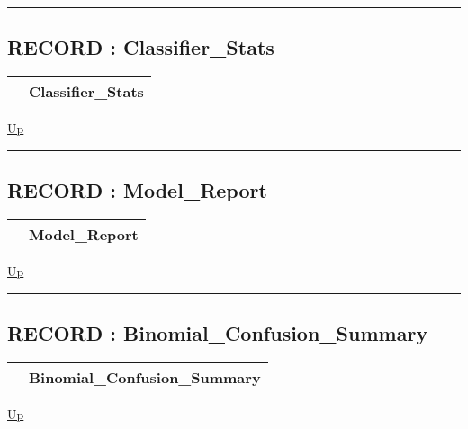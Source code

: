 \rule{\textwidth}{0.4pt}
\subsection*{RECORD : Classifier\_Stats}
\hypertarget{ecldoc:logisticregression.types.classifier_stats}{}

{\renewcommand{\arraystretch}{1.5}
\begin{tabularx}{\textwidth}{|>{\raggedright\arraybackslash}l|X|}
\hline
\hspace{0pt} & Classifier\_Stats \\
\hline
\end{tabularx}
}

\hyperlink{ecldoc:LogisticRegression.Types}{Up}

\par


\rule{\textwidth}{0.4pt}
\subsection*{RECORD : Model\_Report}
\hypertarget{ecldoc:logisticregression.types.model_report}{}

{\renewcommand{\arraystretch}{1.5}
\begin{tabularx}{\textwidth}{|>{\raggedright\arraybackslash}l|X|}
\hline
\hspace{0pt} & Model\_Report \\
\hline
\end{tabularx}
}

\hyperlink{ecldoc:LogisticRegression.Types}{Up}

\par


\rule{\textwidth}{0.4pt}
\subsection*{RECORD : Binomial\_Confusion\_Summary}
\hypertarget{ecldoc:logisticregression.types.binomial_confusion_summary}{}

{\renewcommand{\arraystretch}{1.5}
\begin{tabularx}{\textwidth}{|>{\raggedright\arraybackslash}l|X|}
\hline
\hspace{0pt} & Binomial\_Confusion\_Summary \\
\hline
\end{tabularx}
}

\hyperlink{ecldoc:LogisticRegression.Types}{Up}

\par


